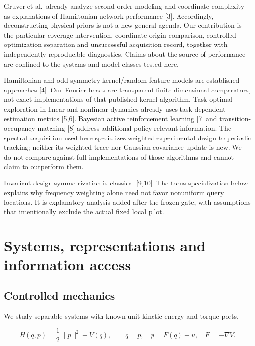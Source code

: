 \documentclass[
  10pt,
]{article}
\begin{document}
Gruver et al.~already analyze second-order modeling and coordinate
complexity as explanations of Hamiltonian-network performance {[}3{]}.
Accordingly, deconstructing physical priors is not a new general agenda.
Our contribution is the particular coverage intervention,
coordinate-origin comparison, controlled optimization separation and
unsuccessful acquisition record, together with independently
reproducible diagnostics. Claims about the source of performance are
confined to the systems and model classes tested here.

Hamiltonian and odd-symmetry kernel/random-feature models are
established approaches {[}4{]}. Our Fourier heads are transparent
finite-dimensional comparators, not exact implementations of that
published kernel algorithm. Task-optimal exploration in linear and
nonlinear dynamics already uses task-dependent estimation metrics
{[}5,6{]}. Bayesian active reinforcement learning {[}7{]} and
transition-occupancy matching {[}8{]} address additional policy-relevant
information. The spectral acquisition used here specializes weighted
experimental design to periodic tracking; neither its weighted trace nor
Gaussian covariance update is new. We do not compare against full
implementations of those algorithms and cannot claim to outperform them.

Invariant-design symmetrization is classical {[}9,10{]}. The torus
specialization below explains why frequency weighting alone need not
favor nonuniform query locations. It is explanatory analysis added after
the frozen gate, with assumptions that intentionally exclude the actual
fixed local pilot.

\hypertarget{systems-representations-and-information-access}{%
\section{Systems, representations and information
access}\label{systems-representations-and-information-access}}

\hypertarget{controlled-mechanics}{%
\subsection{Controlled mechanics}\label{controlled-mechanics}}

We study separable systems with known unit kinetic energy and torque
ports,

\[H(q,p)=\frac12\|p\|^2+V(q),\qquad \dot q=p,\quad \dot p=F(q)+u,\quad F=-\nabla V.\]
\end{document}
